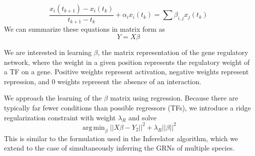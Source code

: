 \documentclass[11pt]{article}
\DeclareMathOperator*{\argmin}{arg\,min}
\begin{document}
\begin{equation}
\frac{x_i(t_{k+1})-x_i(t_k)}{t_{k+1}-t_k} + \alpha_{i}x_{i}(t_k)= \sum \beta_{i,j}x_{j}(t_k)
\end{equation}
\noindent We can summarize these equations in matrix form as
\begin{equation}
Y = X \beta 
\end{equation}

We are interested in learning $\beta$, the matrix representation of the gene regulatory network, where the weight in a given position represents the regulatory weight of a TF on a gene. Positive weights represent activation, negative weights represent repression, and 0 weights represent the absence of an interaction. 

\noindent We approach the learning of the $\beta$ matrix using regression. Because there are typically far fewer conditions than possible regressors (TFs), we introduce a ridge regularization constraint with weight $\lambda_R$ and solve
\begin{equation}
\argmin_\beta\vert \vert X\beta - Y_2 \vert \vert ^2 + \lambda_R \vert \vert \beta \vert \vert ^2
\end{equation}
This is similar to the formulation used in the Inferelator algorithm, which we extend to the case of simultaneously inferring the GRNs of multiple species. 
\end{document}
